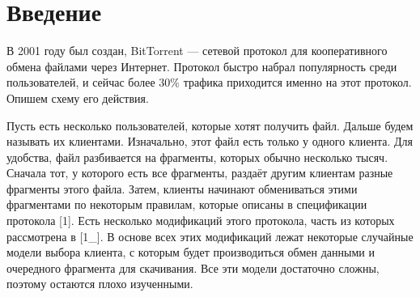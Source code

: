 \documentclass{matmex-diploma-custom}
\theoremstyle{named}
\begin{document}
\maketitle
	
\renewcommand{\contentsname}{Оглавление}
\tableofcontents
\newpage

\section*{Введение}
В 2001 году был создан, BitTorrent --- сетевой протокол для кооперативного обмена файлами через Интернет.
Протокол быстро набрал популярность среди пользователей, и сейчас более 30\% трафика приходится именно на этот протокол.
Опишем схему его действия.

Пусть есть несколько пользователей, которые хотят получить файл. Дальше будем называть их клиентами.
Изначально, этот файл есть только у одного клиента. 
Для удобства, файл разбивается на фрагменты, которых обычно несколько тысяч.
Сначала тот, у которого есть все фрагменты, раздаёт другим клиентам разные фрагменты этого файла.
Затем, клиенты начинают обмениваться этими фрагментами по некоторым правилам, 
которые описаны в спецификации протокола [1].
Есть несколько модификаций этого протокола, часть из которых рассмотрена в [1\_].
В основе всех этих модификаций лежат некоторые случайные модели выбора клиента, с которым будет производиться обмен данными 
и очередного фрагмента для скачивания. Все эти модели достаточно сложны, поэтому остаются плохо изученными.
\end{document}
